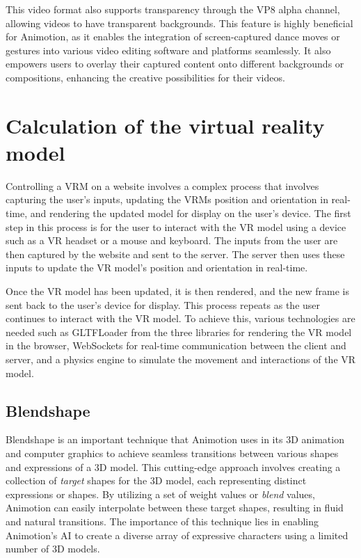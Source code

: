 This video format also supports transparency through the VP8 alpha channel, allowing videos to have 
transparent backgrounds. This feature is highly beneficial for Animotion, as it enables the integration 
of screen-captured dance moves or gestures into various video editing software and platforms seamlessly. 
It also empowers users to overlay their captured content onto different backgrounds or compositions, 
enhancing the creative possibilities for their videos. \cite{webm}

\section{Calculation of the virtual reality model} 
Controlling a VRM on a website involves a complex process that involves 
capturing the user's inputs, updating the VRMs position and orientation in real-time, 
and rendering the updated model for display on the user's device.
The first step in this process is for the user to interact with the VR model 
using a device such as a VR headset or a mouse and keyboard. The inputs from the 
user are then captured by the website and sent to the server. The server then 
uses these inputs to update the VR model's position and orientation in real-time. 

Once the VR model has been updated, it is then rendered, and the new frame is 
sent back to the user's device for display. This process repeats as the user 
continues to interact with the VR model. 
To achieve this, various technologies are needed such as GLTFLoader from the three
libraries for rendering the VR model in the browser, WebSockets for real-time 
communication between the client and server, and a physics engine to simulate 
the movement and interactions of the VR model. 

\subsection{Blendshape}
Blendshape is an important technique that Animotion uses in its 3D animation and computer graphics to 
achieve seamless transitions between various shapes and expressions of a 3D model. This cutting-edge approach 
involves creating a collection of \emph{target} shapes for the 3D model, each representing distinct 
expressions or shapes. By utilizing a set of weight values or \emph{blend} values, Animotion can easily 
interpolate between these target shapes, resulting in fluid and natural transitions. The importance of this technique 
lies in enabling Animotion's AI to create a diverse array of expressive characters using a limited number of 3D models.

